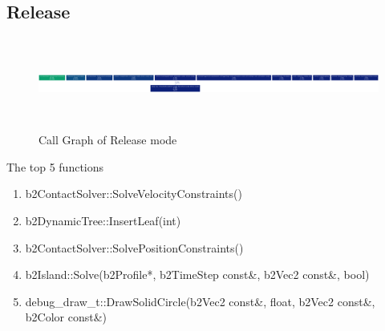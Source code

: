 \documentclass[a4paper]{article}
\begin{document}
\subsection{Release}

 
\begin{figure}[h]

\centering
\includegraphics[width=15cm, height=3cm]{releaseVersion.png}
\caption{Call Graph of Release mode }
\end{figure}

The top 5 functions 

\begin{enumerate}
\item b2ContactSolver::SolveVelocityConstraints()
\item b2DynamicTree::InsertLeaf(int)
\item b2ContactSolver::SolvePositionConstraints()
\item b2Island::Solve(b2Profile*, b2TimeStep const\&, b2Vec2 const\&, bool)
\item  debug\_draw\_t::DrawSolidCircle(b2Vec2 const\&, float, b2Vec2 const\&, b2Color const\&)
 
\end{enumerate}
\end{document}
